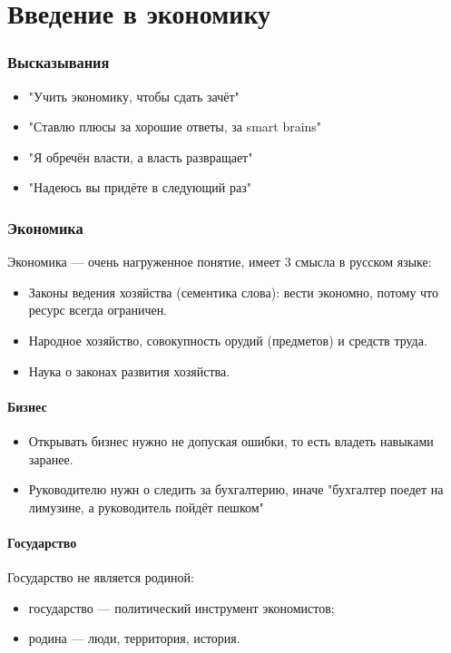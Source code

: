 \documentclass{article}
\begin{document}
\newpage
\part{Введение в экономику}

\section{Высказывания}
\begin{itemize}
    \item "Учить экономику, чтобы сдать зачёт"
    \item "Ставлю плюсы за хорошие ответы, за smart brains"
    \item "Я обречён власти, а власть развращает"
    \item "Надеюсь вы придёте в следующий раз"
\end{itemize}



\section{Экономика}
Экономика --- очень нагруженное понятие, имеет 3 смысла в русском языке:
\begin{itemize}
    \item Законы ведения хозяйства (сементика слова): вести экономно, потому что ресурс всегда ограничен.
    \item Народное хозяйство, совокупность орудий (предметов) и средств труда.
    \item Наука о законах развития хозяйства.
\end{itemize}

\subsection{Бизнес}
\begin{itemize}
    \item Открывать бизнес нужно не допуская ошибки, то есть владеть навыками заранее.
    \item Руководителю нужн о следить за бухгалтерию, иначе "бухгалтер поедет на лимузине, а руководитель пойдёт пешком"
\end{itemize}


\subsection{Государство}
Государство не является родиной:
\begin{itemize}
    \item государство --- политический инструмент экономистов;
    \item родина --- люди, территория, история.
\end{itemize}
\end{document}
